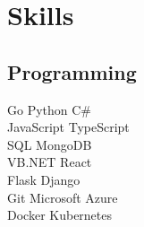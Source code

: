 \documentclass[]{latex/resume}
\begin{document}
\begin{minipage}[t]{0.75\textwidth}
    \sectionsep




%
%   

\end{minipage} 
\hfill
\begin{minipage}[t]{0.25\textwidth} 


\section{Skills}
    \subsection{Programming}
                Go \textbullet{}
                Python \textbullet{}
                C\#
                \\
                JavaScript \textbullet{}
                TypeScript
                \\
        \sectionsep
                SQL \textbullet{}
                MongoDB
                \\
        \sectionsep
                VB.NET \textbullet{}
                React 
                \\
                Flask \textbullet{}
                Django 
                \\
        \sectionsep
                Git  \textbullet{}
                Microsoft Azure
                \\
                Docker \textbullet{}
                Kubernetes
                \\
\sectionsep



\end{minipage}
\end{document}
